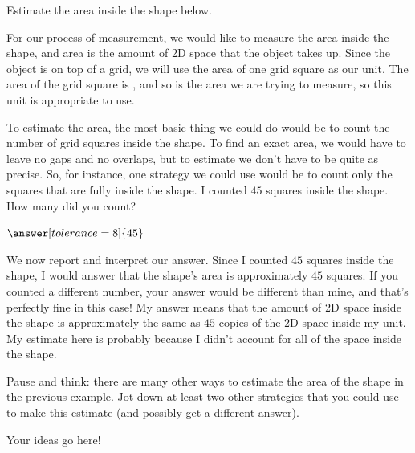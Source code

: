 \documentclass{ximera}
\begin{document}
\begin{example}
Estimate the area inside the shape below.
\begin{image}
\end{image}

For our process of measurement, we would like to measure the area inside the shape, and area is the amount of 2D space that the object takes up. Since the object is on top of a grid, we will use the area of one grid square as our unit. The area of the grid square is , and so is the area we are trying to measure, so this unit is appropriate to use.

To estimate the area, the most basic thing we could do would be to count the number of grid squares inside the shape. To find an exact area, we would have to leave no gaps and no overlaps, but to estimate we don't have to be quite as precise. So, for instance, one strategy we could use would be to count only the squares that are fully inside the shape. I counted $45$ squares inside the shape. How many did you count? \begin{prompt} $\answer[tolerance=8]{45}$ \end{prompt}

We now report and interpret our answer. Since I counted $45$ squares inside the shape, I would answer that the shape's area is approximately $45$ squares. If you counted a different number, your answer would be different than mine, and that's perfectly fine in this case! My answer means that the amount of 2D space inside the shape is approximately the same as $45$ copies of the 2D space inside my unit. My estimate here is probably  because I didn't account for all of the space inside the shape.
\end{example}

\begin{question}
Pause and think: there are many other ways to estimate the area of the shape in the previous example. Jot down at least two other strategies that you could use to make this estimate (and possibly get a different answer).
\begin{freeResponse} Your ideas go here! \end{freeResponse}
\end{question}
\end{document}

